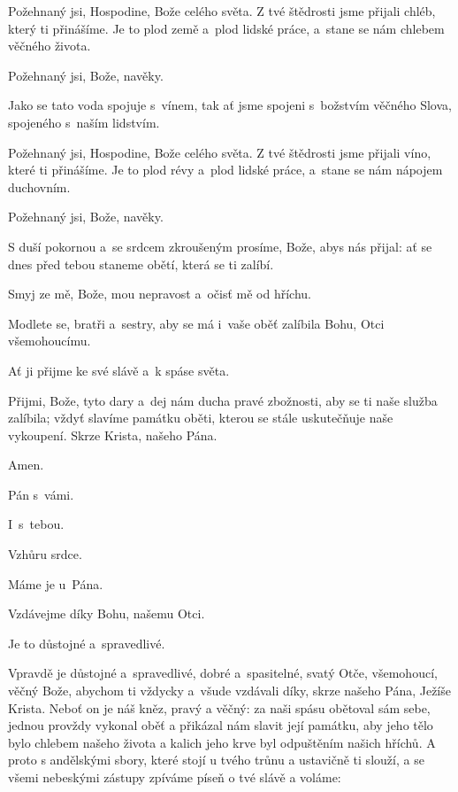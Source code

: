 \mbox{}

Požehnaný jsi, Hospodine, Bože celého světa. Z tvé štědrosti jsme přijali chléb, který ti přinášíme. Je to plod země a~plod lidské práce, a~stane se nám chlebem věčného života.

\Rbardot{} Požehnaný jsi, Bože, navěky.

Jako se tato voda spojuje s~vínem, tak ať jsme spojeni s~božstvím věčného Slova, spojeného s~naším lidstvím.

Požehnaný jsi, Hospodine, Bože celého světa. Z tvé štědrosti jsme přijali víno, které ti přinášíme. Je to plod révy a~plod lidské práce, a~stane se nám nápojem duchovním.

\Rbardot{} Požehnaný jsi, Bože, navěky.

\mbox{}

S duší pokornou a~se srdcem zkroušeným prosíme, Bože, abys nás přijal: ať se dnes před tebou staneme obětí, která se ti zalíbí.

Smyj ze mě, Bože, mou nepravost a~očisť mě od hříchu.

\mbox{}

Modlete se, bratři a~sestry, aby se má i~vaše oběť zalíbila Bohu, Otci všemohoucímu.

\Rbardot{} Ať ji přijme ke své slávě a~k spáse světa.

\mbox{}

Přijmi, Bože, tyto dary a~dej nám ducha pravé zbožnosti, aby se ti naše služba zalíbila; vždyť slavíme památku oběti, kterou se stále uskutečňuje naše vykoupení. Skrze Krista, našeho Pána.

\Rbardot{} Amen.

\Vbardot{} Pán s~vámi.

\Rbardot{} I~s~tebou.

\Vbardot{} Vzhůru srdce.

\Rbardot{} Máme je u~Pána.

\Vbardot{} Vzdávejme díky Bohu, našemu Otci.

\Rbardot{} Je to důstojné a~spravedlivé.

\mbox{}

Vpravdě je důstojné a~spravedlivé, dobré a~spasitelné, svatý Otče, všemohoucí, věčný Bože, abychom ti vždycky a~všude vzdávali díky, skrze našeho Pána, Ježíše Krista. Neboť on je náš kněz, pravý a věčný: za naši spásu obětoval sám sebe, jednou provždy vykonal oběť a přikázal nám slavit její památku, aby jeho tělo bylo chlebem našeho života a kalich jeho krve byl odpuštěním našich hříchů. A proto s andělskými sbory, které stojí u tvého trůnu a ustavičně ti slouží, a se všemi nebeskými zástupy zpíváme píseň o tvé slávě a voláme:
